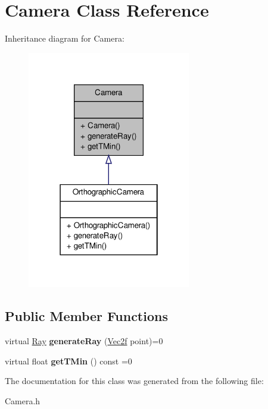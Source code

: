 \hypertarget{classCamera}{\section{\-Camera \-Class \-Reference}
\label{classCamera}
}


\-Inheritance diagram for \-Camera\-:
\nopagebreak
\begin{figure}[H]
\begin{center}
\leavevmode
\includegraphics[width=202pt]{classCamera__inherit__graph}
\end{center}
\end{figure}
\subsection*{\-Public \-Member \-Functions}
\begin{DoxyCompactItemize}
\item 
\hypertarget{classCamera_a38dbd2b70b31ee250aadd83b1bbe87fb}{virtual \hyperlink{classRay}{\-Ray} {\bfseries generate\-Ray} (\hyperlink{classVec2f}{\-Vec2f} point)=0}\label{classCamera_a38dbd2b70b31ee250aadd83b1bbe87fb}

\item 
\hypertarget{classCamera_a476000c8588b1aef575482c86153fcb7}{virtual float {\bfseries get\-T\-Min} () const =0}\label{classCamera_a476000c8588b1aef575482c86153fcb7}

\end{DoxyCompactItemize}


\-The documentation for this class was generated from the following file\-:\begin{DoxyCompactItemize}
\item 
\-Camera.\-h\end{DoxyCompactItemize}
